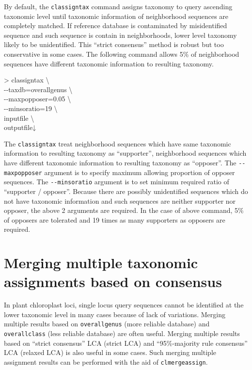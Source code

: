 \documentclass[titlepage,10pt,a4paper,english]{jsbook}
\newenvironment{cmd}{\begin{oframed}\raggedright\ttfamily\footnotesize\setlength{\baselineskip}{1.4em}}{\end{oframed}\vspace{-1em}}
\begin{document}
By default, the \texttt{classigntax} command assigns taxonomy to query ascending taxonomic level until taxonomic information of neighborhood sequences are completely matched.
If reference database is contaminated by misidentified sequence and such sequence is contain in neighborhoods, lower level taxonomy likely to be unidentified.
This ``strict consensus'' method is robust but too conservative in some cases.
The following command allows 5\% of neighborhood sequences have different taxonomic information to resulting taxonomy.
\begin{cmd}
{\textgreater} classigntax {\textbackslash}\\
{-}{-}taxdb=overall{\textunderscore}genus {\textbackslash}\\
{-}{-}maxpopposer=0.05 {\textbackslash}\\
{-}{-}minsoratio=19 {\textbackslash}\\
inputfile {\textbackslash}\\
outputfile↓
\end{cmd}
The \texttt{classigntax} treat neighborhood sequences which have same taxonomic information to resulting taxonomy as ``supporter'', neighborhood sequences which have different taxonomic information to resulting taxonomy as ``opposer''.
The \texttt{{-}{-}maxpopposer} argument is to specify maximum allowing proportion of opposer sequences.
The \texttt{{-}{-}minsoratio} argument is to set minimum required ratio of ``supporter / opposer''.
Because there are possibly unidentified sequences which do not have taxonomic information and such sequences are neither supporter nor opposer, the above 2 arguments are required.
In the case of above command, 5\% of opposers are tolerated and 19 times as many supporters as opposers are required.

\section{Merging multiple taxonomic assignments based on consensus}\label{section:mergingmultipleassignment}

In plant chloroplast loci, single locus query sequences cannot be identified at the lower taxonomic level in many cases because of lack of variations.
Merging multiple results based on \texttt{overall{\textunderscore}genus} (more reliable database) and \texttt{overall{\textunderscore}class} (less reliable database) are often useful.
Merging multiple results based on ``strict consensus'' LCA (strict LCA) and ``95\%-majority rule consensus'' LCA (relaxed LCA) is also useful in some cases.
Such merging multiple assignment results can be performed with the aid of \texttt{clmergeassign}.
\end{document}
